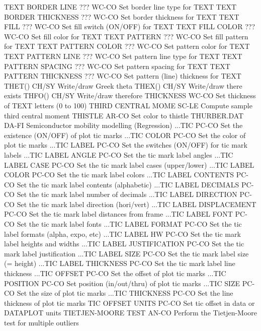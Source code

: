 TEXT BORDER LINE       ???  WC-CO Set border line type for TEXT
TEXT BORDER THICKNESS  ???  WC-CO Set border thickness for TEXT
TEXT FILL              ???  WC-CO Set fill switch (ON/OFF) for TEXT
TEXT FILL COLOR        ???  WC-CO Set fill color for TEXT
TEXT PATTERN           ???  WC-CO Set fill pattern for TEXT
TEXT PATTERN COLOR     ???  WC-CO Set pattern color for TEXT
TEXT PATTERN LINE      ???  WC-CO Set pattern line type for TEXT
TEXT PATTERN SPACING   ???  WC-CO Set pattern spacing for TEXT
TEXT PATTERN THICKNESS ???  WC-CO Set pattern (line) thickness for TEXT
THET()                      CH/SY Write/draw Greek theta
THEX()                      CH/SY Write/draw there exists
THFO()                      CH/SY Write/draw therefore
THICKNESS                   WC-CO Set thickness of TEXT letters (0 to 100)
THIRD CENTRAL MOME          SC-LE Compute sample third central moment
THISTLE                     AR-CO Set color to thistle
THURBER.DAT                 DA-FI Semiconductor mobility modelling (Regression)
...TIC                      PC-CO Set the existence (ON/OFF) of plot tic marks
...TIC COLOR                PC-CO Set the color of plot tic marks
...TIC LABEL                PC-CO Set the switches (ON/OFF) for tic mark labels
...TIC LABEL ANGLE          PC-CO Set the tic mark label angles
...TIC LABEL CASE           PC-CO Set the tic mark label cases (upper/lower)
...TIC LABEL COLOR          PC-CO Set the tic mark label colors
...TIC LABEL CONTENTS       PC-CO Set the tic mark label contents (alphabetic)
...TIC LABEL DECIMALS       PC-CO Set the tic mark label number of decimals
...TIC LABEL DIRECTION      PC-CO Set the tic mark label direction (hori/vert)
...TIC LABEL DISPLACEMENT   PC-CO Set the tic mark label distances from frame
...TIC LABEL FONT           PC-CO Set the tic mark label fonts
...TIC LABEL FORMAT         PC-CO Set the tic label formats (alpha, expo, etc)
...TIC LABEL HW             PC-CO Set the tic mark label heights and widths
...TIC LABEL JUSTIFICATION  PC-CO Set the tic mark label justification
...TIC LABEL SIZE           PC-CO Set the tic mark label size (= height)
...TIC LABEL THICKNESS      PC-CO Set the tic mark label line thickness
...TIC OFFSET               PC-CO Set the offset of plot tic marks
...TIC POSITION             PC-CO Set position (in/out/thru) of plot tic marks
...TIC SIZE                 PC-CO Set the size of plot tic marks
...TIC THICKNESS            PC-CO Set the line thickness of plot tic marks
TIC OFFSET UNITS            PC-CO Set tic offset in data or DATAPLOT units
TIETJEN-MOORE TEST          AN-CO Perform the Tietjen-Moore test for multiple outliers
